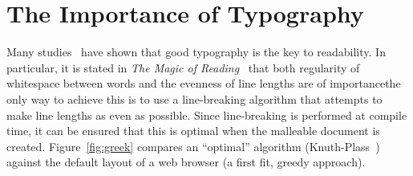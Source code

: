 \section{The Importance of Typography}
Many studies~\cite{Hill1999,Bringhurst2008,Voorhees2011,Legge2011} have shown that good typography is the key to readability. In particular, it is stated in \emph{The Magic of Reading}~\cite{Hill1999} that both regularity of whitespace between words and the evenness of line lengths are of importance\ed the only way to achieve this is to use a line-breaking algorithm that attempts to make line lengths as even as possible. Since line-breaking is performed at compile time, it can be ensured that this is optimal when the malleable document is created. Figure~\ref{fig:greek} compares an ``optimal'' algorithm (Knuth-Plass~\cite{Knuth1981}) against the default layout of a web browser (a first fit, greedy approach).

